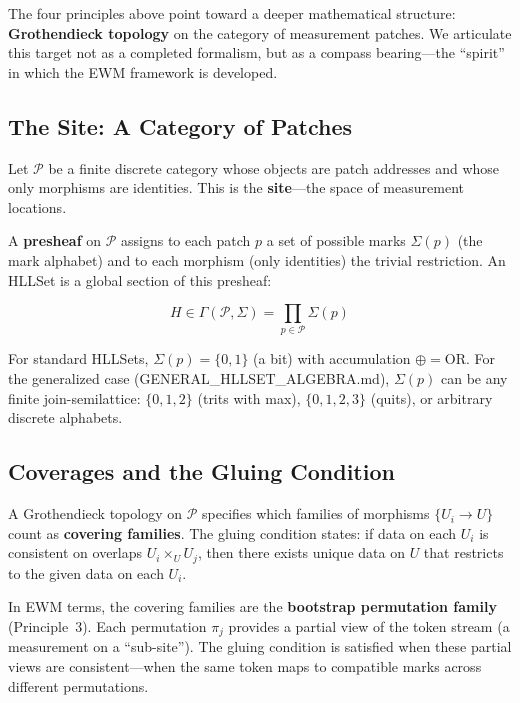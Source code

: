 \documentclass[11pt,a4paper]{article}
\theoremstyle{remark}
\begin{document}
The four principles above point toward a deeper mathematical structure:
\textbf{Grothendieck topology} \cite{grothendieck1972} on the category of measurement
patches. We articulate this target not as a completed formalism, but as a compass
bearing---the ``spirit'' in which the EWM framework is developed.

\subsection{The Site: A Category of Patches}

Let $\mathcal{P}$ be a finite discrete category whose objects are patch addresses and
whose only morphisms are identities. This is the \textbf{site}---the space of measurement
locations.

A \textbf{presheaf} on $\mathcal{P}$ assigns to each patch $p$ a set of possible marks
$\Sigma(p)$ (the mark alphabet) and to each morphism (only identities) the trivial
restriction. An HLLSet is a global section of this presheaf:

\begin{equation}
  H \in \Gamma(\mathcal{P}, \Sigma) = \prod_{p \in \mathcal{P}} \Sigma(p)
\end{equation}

For standard HLLSets, $\Sigma(p) = \{0, 1\}$ (a bit) with accumulation $\oplus =
\text{OR}$. For the generalized case (GENERAL\_HLLSET\_ALGEBRA.md), $\Sigma(p)$ can be
any finite join-semilattice: $\{0, 1, 2\}$ (trits with max), $\{0, 1, 2, 3\}$ (quits),
or arbitrary discrete alphabets.

\subsection{Coverages and the Gluing Condition}

A Grothendieck topology on $\mathcal{P}$ specifies which families of morphisms
$\{U_i \to U\}$ count as \textbf{covering families}. The gluing condition states: if
data on each $U_i$ is consistent on overlaps $U_i \times_U U_j$, then there exists
unique data on $U$ that restricts to the given data on each $U_i$.

In EWM terms, the covering families are the \textbf{bootstrap permutation family}
(Principle~3). Each permutation $\pi_j$ provides a partial view of the token stream
(a measurement on a ``sub-site''). The gluing condition is satisfied when these partial
views are consistent---when the same token maps to compatible marks across different
permutations.
\end{document}
